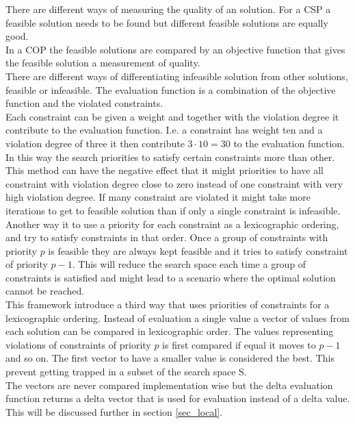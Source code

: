 There are different ways of measuring the quality of an solution. For a CSP a feasible solution needs to be found but 
different feasible solutions are equally good.  \\
In a COP the feasible solutions are compared by an objective function that gives the feasible solution a measurement 
of quality. \\ 
There are different ways of differentiating infeasible solution from other solutions, feasible or infeasible. The 
evaluation function is a combination of the objective function and the violated constraints. \\ 
Each constraint can be given a weight and together with the violation degree it contribute to the evaluation function. 
I.e. a constraint has weight ten and a violation degree of three it then contribute $3\cdot 10 = 30$ to the evaluation 
function. In this way the search priorities to satisfy certain constraints more than other. This method can have the 
negative effect that it might priorities to have all constraint with violation degree close to zero instead of 
one constraint with very high violation degree. If many constraint are violated it might take more iterations to get to 
feasible solution than if only a single constraint is infeasible. \\ 
Another way it to use a priority for each constraint as a lexicographic ordering, and try to satisfy constraints in 
that order. Once a group of constraints with priority $p$ is feasible they are always kept feasible and it tries to 
satisfy constraint of priority $p-1$. This will reduce the search space each time a group of constraints is satisfied 
and might lead to a scenario where the optimal solution cannot be reached. \\ 
This framework introduce a third way that uses priorities of constraints for a lexicographic ordering. Instead of 
evaluation a single value a vector of values from each solution can be compared in lexicographic order. The values 
representing violations of constraints of priority $p$ is first compared if equal it moves to $p-1$ and so on. The 
first vector to have a smaller value is considered the best. This prevent getting trapped in a subset of the search 
space S. \\ 
The vectors are never compared implementation wise but the delta evaluation function returns a delta vector 
that is used for evaluation instead of a delta value. This will be discussed further in section \ref{sec_local}.